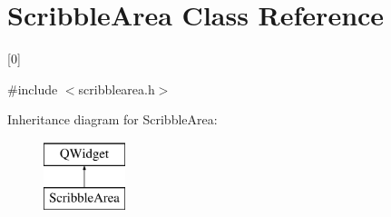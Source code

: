 \hypertarget{class_scribble_area}{\section{Scribble\-Area Class Reference}
\label{class_scribble_area}
}


\mbox{[}0\mbox{]}  




{\ttfamily \#include $<$scribblearea.\-h$>$}

Inheritance diagram for Scribble\-Area\-:\begin{figure}[H]
\begin{center}
\leavevmode
\includegraphics[height=2.000000cm]{class_scribble_area}
\end{center}
\end{figure}

